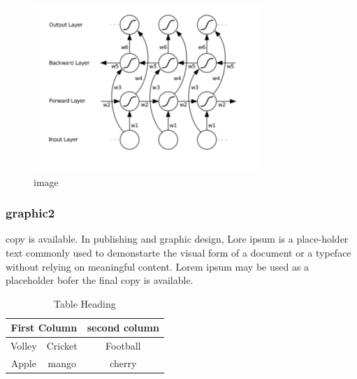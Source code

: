 \documentclass{article}
\begin{document}
\begin{figure}[h]
    \centering
    \includegraphics{assets/image1.png}
    \caption{image}
    \label{fig: an image label}
\end{figure}

\subsubsection{graphic2}

copy is available. In publishing and graphic design, Lore ipsum is a place-holder text commonly used to demonstarte the visual form of a document or a typeface without relying on meaningful content. Lorem ipsum may be used as a placeholder bofer the final copy is available.
\begin{table}[h]
    \centering
    \caption{Table Heading}
    \begin{tabular}{|c|c|c|c|}
        \hline
        \multicolumn{2}{|c|}{First Column} & \multicolumn{2}{|c|}{second column}                                 \\
        \hline
        Volley                             & Cricket                       & \multicolumn{2}{c|}{Football} \\
        \hline
        Apple                              & mango                         & \multicolumn{2}{c|}{cherry}   \\
        \hline
    \end{tabular}
\end{table}
\end{document}
